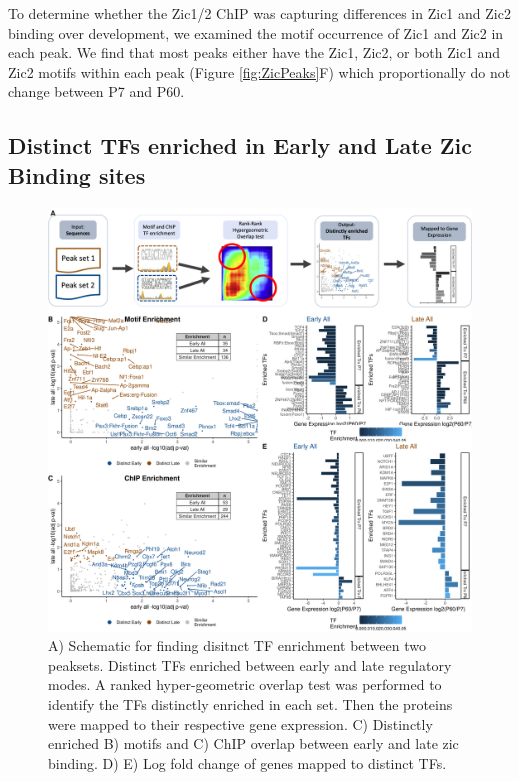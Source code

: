 \documentclass[fleqn,10pt,twocolumn]{wlscirep}
\begin{document}
To determine whether the Zic1/2 ChIP was capturing differences in Zic1 and Zic2 binding over development, we examined the motif occurrence of Zic1 and Zic2 in each peak. We find that most peaks either have the Zic1, Zic2, or both Zic1 and Zic2 motifs within each peak (Figure \ref{fig:ZicPeaks}F) which proportionally do not change between P7 and P60. 



\subsection*{Distinct TFs enriched in Early and Late Zic Binding sites}

\begin{figure}[!ht]
\centering
\includegraphics[width=.95\textwidth]{../figures/figure2.png}
\caption{A) Schematic for finding disitnct TF enrichment between two peaksets. Distinct TFs enriched between early and late regulatory modes. A ranked hyper-geometric overlap test was performed to identify the TFs distinctly enriched in each set. Then the proteins were mapped to their respective gene expression. C) Distinctly enriched B) motifs and C) ChIP overlap between early and late zic binding. D) E) Log fold change of genes mapped to distinct TFs.  }
\label{fig:DistinctTFs}
\end{figure}
\end{document}
